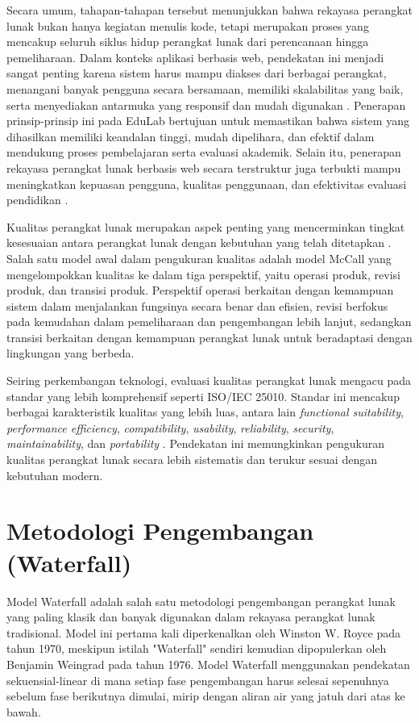 \documentclass[12pt,a4paper,twoside]{report}
\begin{document}
Secara umum, tahapan-tahapan tersebut menunjukkan bahwa rekayasa perangkat lunak bukan hanya kegiatan menulis kode, tetapi merupakan proses yang mencakup seluruh siklus hidup perangkat lunak dari perencanaan hingga pemeliharaan. Dalam konteks aplikasi berbasis web, pendekatan ini menjadi sangat penting karena sistem harus mampu diakses dari berbagai perangkat, menangani banyak pengguna secara bersamaan, memiliki skalabilitas yang baik, serta menyediakan antarmuka yang responsif dan mudah digunakan \cite{pressman2014}. Penerapan prinsip-prinsip ini pada EduLab bertujuan untuk memastikan bahwa sistem yang dihasilkan memiliki keandalan tinggi, mudah dipelihara, dan efektif dalam mendukung proses pembelajaran serta evaluasi akademik. Selain itu, penerapan rekayasa perangkat lunak berbasis web secara terstruktur juga terbukti mampu meningkatkan kepuasan pengguna, kualitas penggunaan, dan efektivitas evaluasi pendidikan \cite{alqurni2023}.

Kualitas perangkat lunak merupakan aspek penting yang mencerminkan tingkat kesesuaian antara perangkat lunak dengan kebutuhan yang telah ditetapkan \cite{pressman2014}. Salah satu model awal dalam pengukuran kualitas adalah model McCall yang mengelompokkan kualitas ke dalam tiga perspektif, yaitu operasi produk, revisi produk, dan transisi produk. Perspektif operasi berkaitan dengan kemampuan sistem dalam menjalankan fungsinya secara benar dan efisien, revisi berfokus pada kemudahan dalam pemeliharaan dan pengembangan lebih lanjut, sedangkan transisi berkaitan dengan kemampuan perangkat lunak untuk beradaptasi dengan lingkungan yang berbeda.

Seiring perkembangan teknologi, evaluasi kualitas perangkat lunak mengacu pada standar yang lebih komprehensif seperti ISO/IEC 25010. Standar ini mencakup berbagai karakteristik kualitas yang lebih luas, antara lain \textit{functional suitability}, \textit{performance efficiency}, \textit{compatibility}, \textit{usability}, \textit{reliability}, \textit{security}, \textit{maintainability}, dan \textit{portability} \cite{sarwosri2023}. Pendekatan ini memungkinkan pengukuran kualitas perangkat lunak secara lebih sistematis dan terukur sesuai dengan kebutuhan modern.

\section{Metodologi Pengembangan (Waterfall)}

Model Waterfall adalah salah satu metodologi pengembangan perangkat lunak yang paling klasik dan banyak digunakan dalam rekayasa perangkat lunak tradisional. Model ini pertama kali diperkenalkan oleh Winston W. Royce pada tahun 1970, meskipun istilah "Waterfall" sendiri kemudian dipopulerkan oleh Benjamin Weingrad pada tahun 1976. Model Waterfall menggunakan pendekatan sekuensial-linear di mana setiap fase pengembangan harus selesai sepenuhnya sebelum fase berikutnya dimulai, mirip dengan aliran air yang jatuh dari atas ke bawah\cite{thesing2021}.
\end{document}
